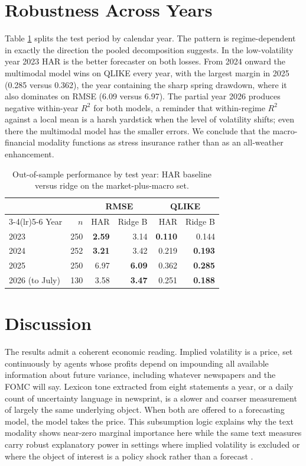 \documentclass[10pt,twocolumn]{article}
\begin{document}
\section{Robustness Across Years}
Table \ref{tab:yearly} splits the test period by calendar year. The pattern is regime-dependent in exactly the direction the pooled decomposition suggests. In the low-volatility year 2023 HAR is the better forecaster on both losses. From 2024 onward the multimodal model wins on QLIKE every year, with the largest margin in 2025 (0.285 versus 0.362), the year containing the sharp spring drawdown, where it also dominates on RMSE (6.09 versus 6.97). The partial year 2026 produces negative within-year $R^2$ for both models, a reminder that within-regime $R^2$ against a local mean is a harsh yardstick when the level of volatility shifts; even there the multimodal model has the smaller errors. We conclude that the macro-financial modality functions as stress insurance rather than as an all-weather enhancement.

\begin{table}[t]
\centering\small
\caption{Out-of-sample performance by test year: HAR baseline versus ridge on the market-plus-macro set.}
\label{tab:yearly}
\begin{tabular}{lrrrrr}
\toprule
 & & \multicolumn{2}{c}{RMSE} & \multicolumn{2}{c}{QLIKE}\\
\cmidrule(lr){3-4}\cmidrule(lr){5-6}
Year & $n$ & HAR & Ridge B & HAR & Ridge B\\
\midrule
2023 & 250 & \textbf{2.59} & 3.14 & \textbf{0.110} & 0.144\\
2024 & 252 & \textbf{3.21} & 3.42 & 0.219 & \textbf{0.193}\\
2025 & 250 & 6.97 & \textbf{6.09} & 0.362 & \textbf{0.285}\\
2026 (to July) & 130 & 3.58 & \textbf{3.47} & 0.251 & \textbf{0.188}\\
\bottomrule
\end{tabular}
\end{table}

\section{Discussion}
The results admit a coherent economic reading. Implied volatility is a price, set continuously by agents whose profits depend on impounding all available information about future variance, including whatever newspapers and the FOMC will say. Lexicon tone extracted from eight statements a year, or a daily count of uncertainty language in newsprint, is a slower and coarser measurement of largely the same underlying object. When both are offered to a forecasting model, the model takes the price. This subsumption logic explains why the text modality shows near-zero marginal importance here while the same text measures carry robust explanatory power in settings where implied volatility is excluded or where the object of interest is a policy shock rather than a forecast \cite{baker2016,hansen2016,tetlock2007}.
\end{document}
